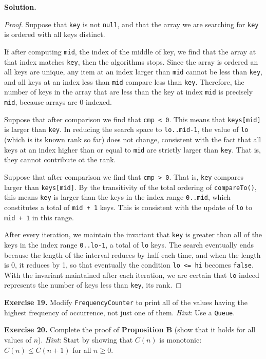 \documentclass[12pt, a4paper]{article}
\newenvironment{ex}[2][Exercise]
{\par\medskip\noindent \textbf{#1 #2.}}
{\medskip}
\newenvironment{sol}[1][Solution]
{\par\medskip\noindent \textbf{#1.} }
{\medskip}
\begin{document}
	\begin{sol}
		\begin{proof}
			Suppose that \texttt{key} is not \texttt{null}, and that the array we are
			searching for \texttt{key} is ordered with all keys distinct.
			
			If after computing \texttt{mid}, the index of the middle of key, we find that the array
			at that index matches \texttt{key}, then the algorithms stops. Since the array
			is ordered an all keys are unique, any item at an index larger than \texttt{mid}
			cannot be less than \texttt{key}, and all keys at an index less than
			\texttt{mid} compare less than \texttt{key}. Therefore, the number of keys in the
			array that are less than the key at index \texttt{mid} is precisely \texttt{mid},
			because arrays are 0-indexed.
			
			Suppose that after comparison we find that \texttt{cmp < 0}. This means that
			\texttt{keys[mid]} is larger than \texttt{key}. In reducing the search space to \texttt{lo..mid-1}, the value of \texttt{lo} (which is its known rank so far) does not change, consistent with the fact that all keys at an index higher than or equal
			to \texttt{mid} are strictly larger than \texttt{key}. That is, they cannot contribute
			ot the rank.
			
			Suppose that after comparison we find that \texttt{cmp > 0}. That is,
			\texttt{key} compares larger than \texttt{keys[mid]}. By the transitivity
			of the total ordering of \texttt{compareTo()}, this means \texttt{key}
			is larger than the keys in the index range \texttt{0..mid}, which constitutes
			a total of \texttt{mid + 1} keys. This is consistent with the update of \texttt{lo}
			to \texttt{mid + 1} in this range.
			
			After every iteration, we maintain the invariant that \texttt{key} is greater
			than all of the keys in the index range \texttt{0..lo-1}, a total of \texttt{lo}
			keys. The search eventually ends because the length of the interval reduces by
			half each time, and when the length is 0, it reduces by 1, so that eventually
			the condition \texttt{lo <= hi} becomes \texttt{false}. With the invariant
			maintained after each iteration, we are certain that \texttt{lo} indeed represents
			the number of keys less than \texttt{key}, its rank.
		\end{proof}
	\end{sol}
	\begin{ex}{19}
		Modify \texttt{FrequencyCounter} to print all of the values having the highest frequency
		of occurrence, not just one of them. \emph{Hint}: Use a \texttt{Queue}.
	\end{ex}
	\begin{ex}{20}
		Complete the proof of \textbf{Proposition B} (show that it holds for all values
		of $n$). \emph{Hint}: Start by showing that $C(n)$ is monotonic: $C(n)\leq C(n+1)$
		for all $n\geq 0$.
	\end{ex}
	\pagebreak
	\printbibliography
\end{document}
